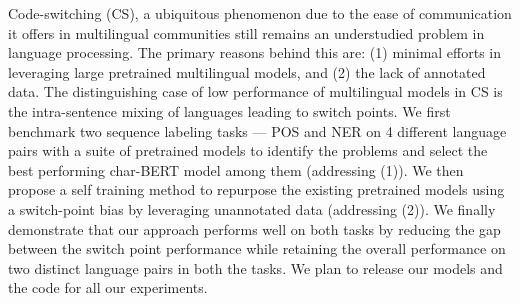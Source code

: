Code-switching (CS), a ubiquitous phenomenon due to the ease of communication it offers in multilingual communities still remains an understudied problem in language processing. The primary reasons behind this are: (1) minimal efforts in leveraging large pretrained multilingual models, and (2) the lack of annotated data. The distinguishing case of low performance of multilingual models in CS is the intra-sentence mixing of languages leading to switch points. We first benchmark two sequence labeling tasks --- POS and NER on 4 different language pairs with a suite of pretrained models to identify the problems and select the best performing char-BERT model among them (addressing (1)). We then propose a self training method to repurpose the existing pretrained models using a switch-point bias by leveraging unannotated data (addressing (2)). We finally demonstrate that our approach performs well on both tasks by reducing the gap between the switch point performance while retaining the overall performance on two distinct language pairs in both the tasks. We plan to release our models and the code for all our experiments.
